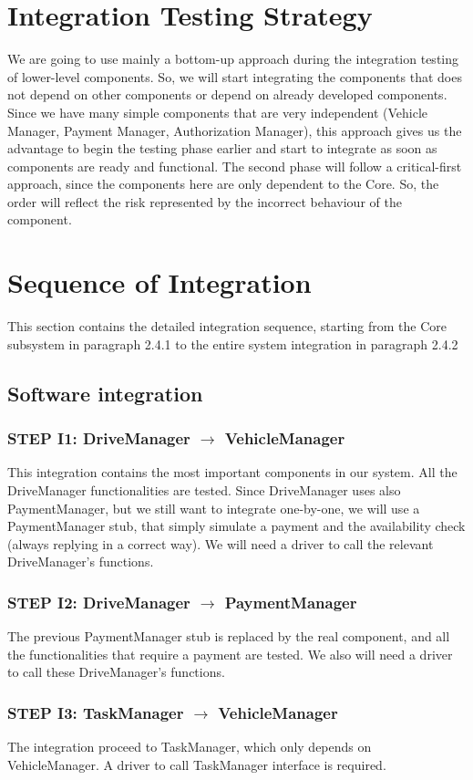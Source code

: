 \section{Integration Testing Strategy}
We are going to use mainly a bottom-up approach during the integration testing of lower-level components. So, we will start integrating the components that does not depend on other components or depend on already developed components. Since we have many simple components that are very independent (Vehicle Manager, Payment Manager, Authorization Manager), this approach gives us the advantage to begin the testing phase earlier and start to integrate as soon as components are ready and functional. 
The second phase will follow a critical-first approach, since the components here are only dependent to the Core. So, the order will reflect the risk represented by the incorrect behaviour of the component.

\section{Sequence of Integration}
This section contains the detailed integration sequence, starting from the Core subsystem in paragraph 2.4.1 to the entire system integration in paragraph 2.4.2

\subsection{Software integration}
\subsubsection{STEP I1: DriveManager $\rightarrow$ VehicleManager}
This integration contains the most important components in our system. All the DriveManager functionalities are tested. Since DriveManager uses also PaymentManager, but we still want to integrate one-by-one, we will use a PaymentManager stub, that simply simulate a payment and the availability check (always replying in a correct way). We will need a driver to call the relevant DriveManager's functions.
\subsubsection{STEP I2: DriveManager $\rightarrow$ PaymentManager}
The previous PaymentManager stub is replaced by the real component, and all the functionalities that require a payment are tested. We also will need a driver to call these DriveManager's functions.
\subsubsection{STEP I3: TaskManager $\rightarrow$ VehicleManager}
The integration proceed to TaskManager, which only depends on VehicleManager. A driver to call TaskManager interface is required.
